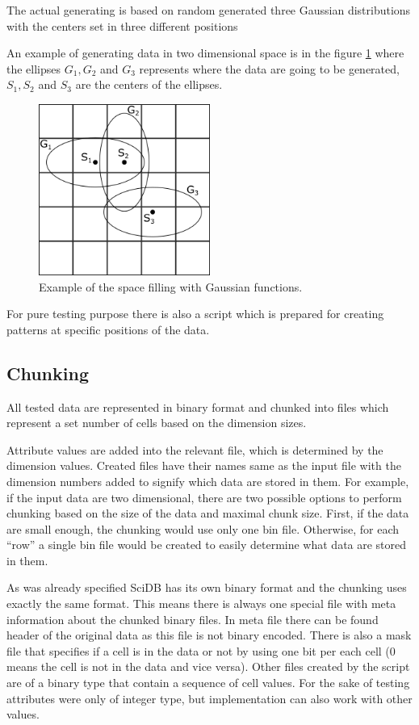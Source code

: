 The actual generating is based on random generated three Gaussian distributions with the centers set in three different positions

An example of generating data in two dimensional space is in the figure \ref{gauss} where the ellipses $G_1, G_2$ and $G_3$ represents where the data are going to be generated, $S_1, S_2$ and $S_3$ are the centers of the ellipses.


\begin{figure}
\centering
\includegraphics[width=0.5\textwidth]{gauss}
\caption{Example of the space filling with Gaussian functions. \cite{mdApproxPM}}
\label{gauss}
\end{figure}

For pure testing purpose there is also a script which is prepared for creating patterns at specific positions of the data.

\subsection{Chunking}\label{chunking}
All tested data are represented in binary format and chunked into files which represent a set number of cells based on the dimension sizes.

Attribute values are added into the relevant file, which is determined by the dimension values. Created files have their names same as the input file with the dimension numbers added to signify which data are stored in them. For example, if the input data are two dimensional, there are two possible options to perform chunking based on the size of the data and maximal chunk size. First, if the data are small enough, the chunking would use only one bin file. Otherwise, for each ``row'' a single bin file would be created to easily determine what data are stored in them.

As was already specified SciDB has its own binary format and the chunking uses exactly the same format. This means there is always one special file with meta information about the chunked binary files. In meta file there can be found header of the original data as this file is not binary encoded. There is also a mask file that specifies if a cell is in the data or not by using one bit per each cell (0 means the cell is not in the data and vice versa). Other files created by the script are of a binary type that contain a sequence of cell values. For the sake of testing attributes were only of integer type, but implementation can also work with other values.

